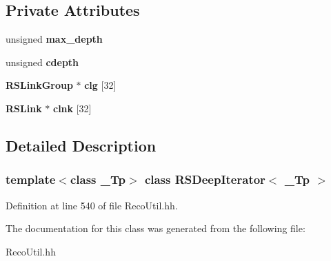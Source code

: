 \subsection*{Private Attributes}
\begin{DoxyCompactItemize}
\item 
unsigned {\bfseries max\_\-depth}\label{classRSDeepIterator_ac7e35d0bc6564ced0fba22e897de2077}

\item 
unsigned {\bfseries cdepth}\label{classRSDeepIterator_ab9649bd60bd774285389d9e58aa7433f}

\item 
{\bf RSLinkGroup} $\ast$ {\bfseries clg} [32]\label{classRSDeepIterator_ada447dc246ba74d344c20dec4d706345}

\item 
{\bf RSLink} $\ast$ {\bfseries clnk} [32]\label{classRSDeepIterator_a3c744e3562ff2491e8c4c95e7153cfab}

\end{DoxyCompactItemize}


\subsection{Detailed Description}
\subsubsection*{template$<$class \_\-Tp$>$ class RSDeepIterator$<$ \_\-Tp $>$}



Definition at line 540 of file RecoUtil.hh.

The documentation for this class was generated from the following file:\begin{DoxyCompactItemize}
\item 
RecoUtil.hh\end{DoxyCompactItemize}
